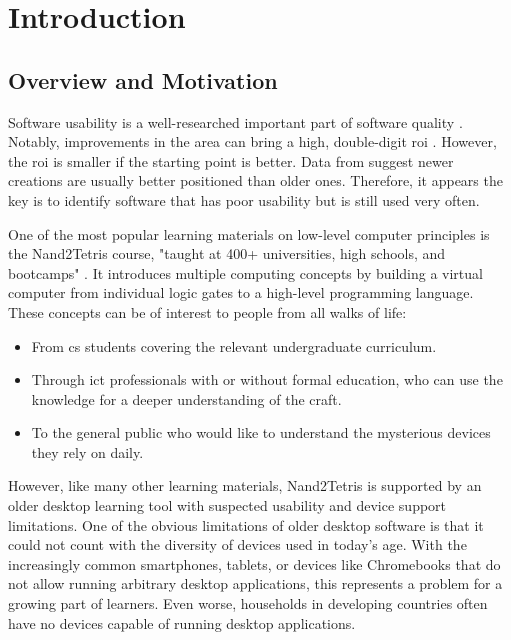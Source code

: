 \chapter{Introduction}
\label{Introduction}

\section{Overview and Motivation}

Software usability is a well-researched important part of software quality \parencite{Almazroi2021}.
Notably, improvements in the area can bring a high, double-digit \gls{roi} \parencite{Nielsen_2008}.
However, the \gls{roi} is smaller if the starting point is better.
Data from \textcite{Nielsen_2008} suggest newer creations are usually better positioned than older ones.
Therefore, it appears the key is to identify software that has poor usability but is still used very often.

One of the most popular learning materials on low-level computer principles is the Nand2Tetris course, "taught at 400+ universities, high schools, and bootcamps" \parencite{nand2tetrisweb}.
It introduces multiple computing concepts by building a virtual computer from individual logic gates to a high-level programming language.
These concepts can be of interest to people from all walks of life:

\begin{itemize}
    \item From \gls{cs} students covering the relevant undergraduate curriculum.
    \item Through \gls{ict} professionals with or without formal education, who can use the knowledge for a deeper understanding of the craft.
    \item To the general public who would like to understand the mysterious devices they rely on daily.
\end{itemize}

However, like many other learning materials, Nand2Tetris is supported by an older desktop learning tool with suspected usability and device support limitations.
One of the obvious limitations of older desktop software is that it could not count with the diversity of devices used in today's age.
With the increasingly common smartphones, tablets, or devices like Chromebooks that do not allow running arbitrary desktop applications, this represents a problem for a growing part of learners.
Even worse, households in developing countries often have no devices capable of running desktop applications.

